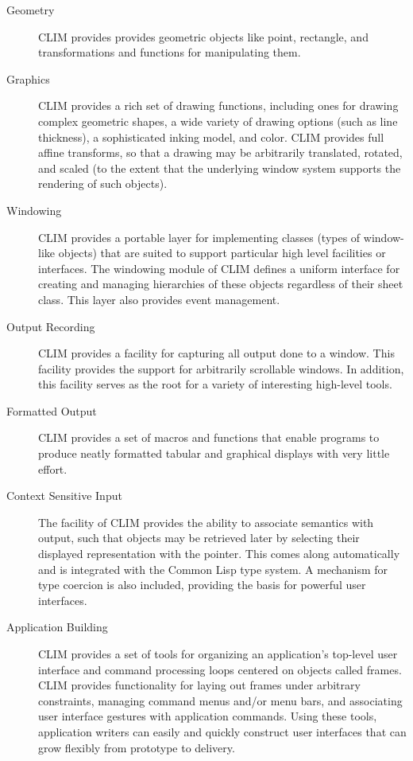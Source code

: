 \begin{description}

\item [Geometry]  CLIM provides provides geometric objects like point,
rectangle, and transformations and functions for manipulating them.

\item [Graphics]  CLIM provides a rich set of drawing functions,
including ones for drawing complex geometric shapes, a wide variety of drawing
options (such as line thickness), a sophisticated inking model, and color.
CLIM provides full affine transforms, so that a drawing may be arbitrarily
translated, rotated, and scaled (to the extent that the underlying window
system supports the rendering of such objects).

\item [Windowing] CLIM provides a portable layer for implementing 
classes (types of window-like objects) that are suited to support particular
high level facilities or interfaces.  The windowing module of CLIM defines a
uniform interface for creating and managing hierarchies of these objects
regardless of their sheet class.  This layer also provides event management.

\item [Output Recording]  CLIM provides a facility for capturing all output
done to a window.  This facility provides the support for arbitrarily scrollable
windows.  In addition, this facility serves as the root for a variety of
interesting high-level tools.

\item [Formatted Output] CLIM provides a set of macros and functions that enable
programs to produce neatly formatted tabular and graphical displays with very
little effort.

\item [Context Sensitive Input] The  facility of CLIM
provides the ability to associate semantics with output, such that objects may
be retrieved later by selecting their displayed representation with the pointer.
This  comes along automatically and is integrated with the
Common Lisp type system.  A mechanism for type coercion is also included,
providing the basis for powerful user interfaces.

\item [Application Building] CLIM provides a set of tools for organizing an
application's top-level user interface and command processing loops centered on
objects called frames.  CLIM provides functionality for laying out frames under
arbitrary constraints, managing command menus and/or menu bars, and associating
user interface gestures with application commands.  Using these tools,
application writers can easily and quickly construct user interfaces that can
grow flexibly from prototype to delivery.


\end{description}

